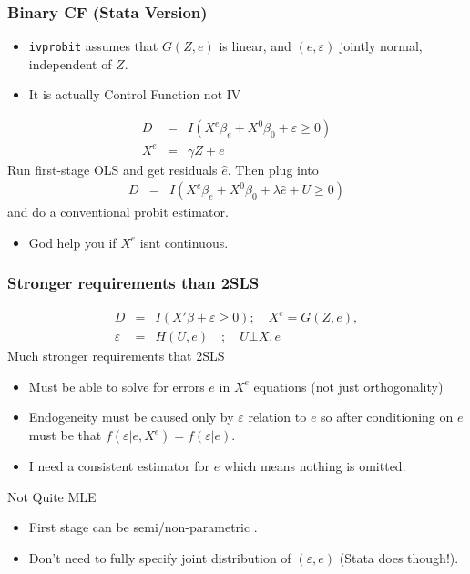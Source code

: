 \begin{frame}
\frametitle{Binary CF (Stata Version)}
\begin{itemize}
\item \texttt{ivprobit} assumes that $G(Z,e)$ is linear, and $(e,\varepsilon)$ jointly normal, independent of $Z$.
\item It is actually Control Function not IV
\end{itemize}
\begin{eqnarray*}
D &=& I ( X^e  \beta_e + X^0 \beta_0+ \varepsilon \geq 0 ) \\
 X^e &=& \gamma Z + e  
\end{eqnarray*}
Run first-stage OLS and get residuals $\hat{e}$. Then plug into
\begin{eqnarray*}
D &=& I ( X^e  \beta_e + X^0 \beta_0 + \lambda \hat{e} + U  \geq 0 )
\end{eqnarray*}
and do a conventional probit estimator.
\begin{itemize}
\item God help you if $X^e$ isnt continuous.
\end{itemize}

\end{frame}

\begin{frame}
\frametitle{Stronger requirements than 2SLS}
\vspace{-10pt}
\begin{eqnarray*}
D &=& I ( X' \beta + \varepsilon \geq 0 ) ; \quad  X^e = G(Z,e) ,  \\
\varepsilon &=& H(U,e) \quad ; \quad U \bot X,e
\end{eqnarray*}
Much stronger requirements that 2SLS
\begin{itemize}
\item Must be able to solve for errors $e$ in $X^e$ equations (not just orthogonality)
\item Endogeneity must be caused only by $\varepsilon$ relation to $e$ so after conditioning on $e$ must be that $f(\varepsilon | e, X^{e}) = f( \varepsilon | e)$.
\item I need a consistent estimator for $e$ which means nothing is omitted.
\end{itemize}
Not Quite MLE
\begin{itemize}
\item First stage can be semi/non-parametric .
\item Don't need to fully specify joint distribution of $(\varepsilon,e)$ (Stata does though!).
\end{itemize}


\end{frame}


